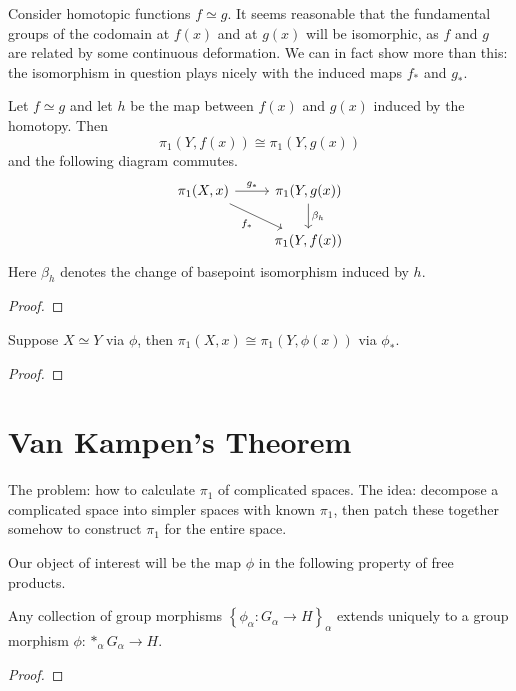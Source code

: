 \documentclass[twoside,10pt]{report}
\begin{document}
Consider homotopic functions $f \simeq g$. It seems reasonable that the fundamental groups of the codomain at $f(x)$ and at $g(x)$ will be isomorphic, as $f$ and $g$ are related by some continuous deformation. We can in fact show more than this: the isomorphism in question plays nicely with the induced maps $f_{*}$ and $g_{*}$.
\begin{lem}
	Let $f \simeq g$ and let $h$ be the map between $f(x)$ and $g(x)$ induced by the homotopy. Then
	\[
		\pi_1(Y,f(x)) \cong \pi_1(Y,g(x))
	\] and the following diagram commutes.
	\[
	\begin{tikzcd}
		\pi_1(X,x) \rar{g_{*}} \arrow[dr, "f_{*}"'] & \pi_1(Y, g(x)) \dar{\beta_{h}} \\
					     & \pi_1(Y,f(x))
	\end{tikzcd}
	\] 
	Here $\beta_{h}$ denotes the change of basepoint isomorphism induced by $h$.
\end{lem}
\begin{proof}

\end{proof}

\begin{prop}
Suppose $X \simeq Y$ via $\phi$, then $\pi_1(X,x) \cong \pi_1(Y,\phi(x))$ via $\phi_{*}$.
\end{prop}
\begin{proof}
\end{proof}



\section{Van Kampen's Theorem}

The problem: how to calculate $\pi_1$ of complicated spaces. The idea: decompose a complicated space into simpler spaces with known $\pi_1$, then patch these together somehow to construct $\pi_1$ for the entire space.

Our object of interest will be the map $\phi$ in the following property of free products.

\begin{prop}
	Any collection of group morphisms $\left\{ \phi_{\alpha}:G_{\alpha}\to H \right\}_{\alpha}$ extends uniquely to a group morphism $\phi:*_{\alpha}G_{\alpha}\to H$.
\end{prop}
\begin{proof}
\end{proof}
\end{document}
